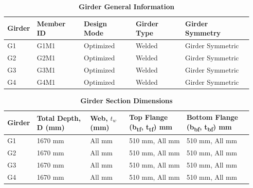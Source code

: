 \documentclass[12pt,a4paper]{report}
\numberwithin{table}{chapter}
\numberwithin{figure}{chapter}
\begin{document}
\newpage

\vspace{0.4em}
\noindent

\vspace{4pt}
\begin{longtable}{|L{2.2cm}|L{1.8cm}|p{3.8cm}|p{3.8cm}|p{3.8cm}|}
\caption{\textbf{Girder General Information}}
\hline
\textbf{Girder} & \textbf{Member ID} & \textbf{Design Mode} & \textbf{Girder Type} & \textbf{Girder Symmetry} \\[6pt]
\hline
G1 & G1M1 & Optimized & Welded & Girder Symmetric \\[8pt]
\hline
G2 & G2M1 & Optimized & Welded & Girder Symmetric \\[8pt]
\hline
G3 & G3M1 & Optimized & Welded & Girder Symmetric \\[8pt]
\hline
G4 & G4M1 & Optimized & Welded & Girder Symmetric \\[8pt]
\hline
\end{longtable}

\vspace{0.6em}

\vspace{4pt}
\begin{longtable}{|L{1.8cm}|L{2.3cm}|L{1.8cm}|p{4.8cm}|p{4.8cm}|}
\caption{\textbf{Girder Section Dimensions}}
\hline
\textbf{Girder} & \textbf{Total Depth, D (mm)} & \textbf{Web, $t_w$ (mm)} & \textbf{Top Flange (b\textsubscript{tf}, t\textsubscript{tf}) mm} & \textbf{Bottom Flange (b\textsubscript{bf}, t\textsubscript{bf}) mm} \\[6pt]
\hline
G1 & 1670 mm & All mm & 510 mm, All mm & 510 mm, All mm \\[8pt]
\hline
G2 & 1670 mm & All mm & 510 mm, All mm & 510 mm, All mm \\[8pt]
\hline
G3 & 1670 mm & All mm & 510 mm, All mm & 510 mm, All mm \\[8pt]
\hline
G4 & 1670 mm & All mm & 510 mm, All mm & 510 mm, All mm \\[8pt]
\hline
\end{longtable}

\vspace{0.6em}
\end{document}
